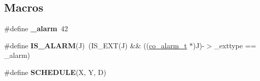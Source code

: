 \subsection*{Macros}
\begin{DoxyCompactItemize}
\item 
\hypertarget{serval-dna_8c_a14e0b93876e52cc552f15e115574a5f7}{\#define {\bfseries \+\_\+alarm}~42}\label{serval-dna_8c_a14e0b93876e52cc552f15e115574a5f7}

\item 
\hypertarget{serval-dna_8c_a424c673123b463e7d8bdd369464d4ca3}{\#define {\bfseries I\+S\+\_\+\+A\+L\+A\+R\+M}(J)~(I\+S\+\_\+\+E\+X\+T(J) \&\& ((\hyperlink{structco__alarm__t}{co\+\_\+alarm\+\_\+t} $\ast$)J)-\/$>$\+\_\+exttype == \+\_\+alarm)}\label{serval-dna_8c_a424c673123b463e7d8bdd369464d4ca3}

\item 
\#define {\bfseries S\+C\+H\+E\+D\+U\+L\+E}(X, Y, D)
\end{DoxyCompactItemize}
